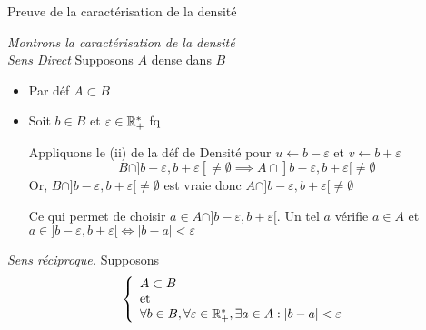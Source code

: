 \documentclass{article}
\renewenvironment{question_kholle}[2][ ]
{
	\subsection{\texorpdfstring{#2}{}}
	\notblank{#1}
	{
		\noindent #1
		\bigbreak
	}
	{}
	\begin{proof}
}
{
	\end{proof}
}
\begin{document}
	{Preuve de la caractérisation de la densité}

	\textit{Montrons la caractérisation de la densité}\\
	\emph{Sens Direct} Supposons $A$ dense dans $B$
	\begin{itemize}[label=\textemdash]
		\item Par déf $A \subset B$
		\item Soit $b \in B$ et $\varepsilon \in \mathbb R_+^*$ fq

		      Appliquons le (ii) de la déf de Densité pour $u \leftarrow b - \varepsilon$ et $v \leftarrow b + \varepsilon$
		      $$B \cap ]b - \varepsilon, b + \varepsilon[ \neq \emptyset \implies A \cap ]b - \varepsilon,  b + \varepsilon[ \neq \emptyset$$
			      Or, $B \cap ]b - \varepsilon, b + \varepsilon[ \neq \emptyset$ est vraie
				      donc $A \cap ]b - \varepsilon,  b + \varepsilon[ \neq \emptyset$

				      Ce qui permet de choisir $a \in A \cap ]b - \varepsilon,  b + \varepsilon[$.
				      Un tel $a$ vérifie $a \in A$ et $a \in ]b - \varepsilon,  b + \varepsilon[ \iff |b-a| < \varepsilon$
	\end{itemize}
	\bigbreak
	\noindent \emph{Sens réciproque.} Supposons
	\[
		\left\{\begin{array}{ll} A \subset B \\\mathrm{et}\\ \forall b \in B, \forall \varepsilon \in \mathbb R_+^*, \exists a \in A: |b-a|< \varepsilon \end{array}\right.
	\]


\end{question_kholle}
\end{document}
